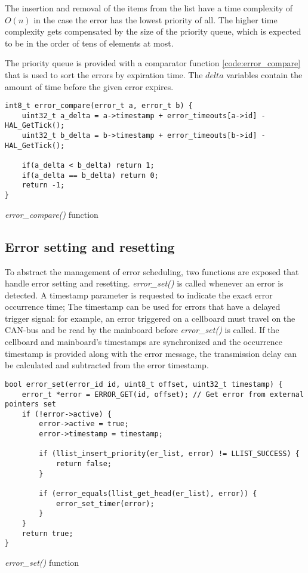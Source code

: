 The insertion and removal of the items from the list have a time complexity of $O(n)$ in the case the error has the lowest priority of all. The higher time complexity gets compensated by the size of the priority queue, which is expected to be in the order of tens of elements at most.

The priority queue is provided with a comparator function \autoref{code:error_compare} that is used to sort the errors by expiration time. The $delta$ variables contain the amount of time before the given error expires.

\begin{listing}[h]
	\begin{verbatim}
int8_t error_compare(error_t a, error_t b) {
	uint32_t a_delta = a->timestamp + error_timeouts[a->id] - HAL_GetTick();
	uint32_t b_delta = b->timestamp + error_timeouts[b->id] - HAL_GetTick();

	if(a_delta < b_delta) return 1;
	if(a_delta == b_delta) return 0;
	return -1;
}
	\end{verbatim}
	\caption{\textit{error\_compare()} function}
	\label{code:error_compare}
\end{listing}

\subsection{Error setting and resetting}
To abstract the management of error scheduling, two functions are exposed that handle error setting and resetting. \textit{error\_set()} is called whenever an error is detected. A timestamp parameter is requested to indicate the exact error occurrence time; The timestamp can be used for errors that have a delayed trigger signal: for example, an error triggered on a cellboard must travel on the CAN-bus and be read by the mainboard before \textit{error\_set()} is called. If the cellboard and mainboard's timestamps are synchronized and the occurrence timestamp is provided along with the error message, the transmission delay can be calculated and subtracted from the error timestamp.
\begin{listing}[h]
	\begin{verbatim}
bool error_set(error_id id, uint8_t offset, uint32_t timestamp) {
	error_t *error = ERROR_GET(id, offset); // Get error from external pointers set
	if (!error->active) {
		error->active = true;
		error->timestamp = timestamp;

		if (llist_insert_priority(er_list, error) != LLIST_SUCCESS) {
			return false;
		}

		if (error_equals(llist_get_head(er_list), error)) {
			error_set_timer(error);
		}
	}
	return true;
}	
	\end{verbatim}
	\caption{\textit{error\_set()} function}
	\label{code:error_set}
\end{listing}

